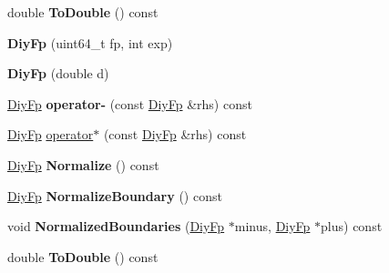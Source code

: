 \begin{DoxyCompactItemize}
\item 
double {\bfseries To\+Double} () const \hypertarget{structinternal_1_1_diy_fp_a9bbdcfcf5d1b3a7b16a8f5f860d74038}{}\label{structinternal_1_1_diy_fp_a9bbdcfcf5d1b3a7b16a8f5f860d74038}

\item 
{\bfseries Diy\+Fp} (uint64\+\_\+t fp, int exp)\hypertarget{structinternal_1_1_diy_fp_a9a8f2f5c49dfa0dee4a527f0829cc2e5}{}\label{structinternal_1_1_diy_fp_a9a8f2f5c49dfa0dee4a527f0829cc2e5}

\item 
{\bfseries Diy\+Fp} (double d)\hypertarget{structinternal_1_1_diy_fp_adc132c7da4c8e3ee5ae12efdcf6dbf7c}{}\label{structinternal_1_1_diy_fp_adc132c7da4c8e3ee5ae12efdcf6dbf7c}

\item 
\hyperlink{structinternal_1_1_diy_fp}{Diy\+Fp} {\bfseries operator-\/} (const \hyperlink{structinternal_1_1_diy_fp}{Diy\+Fp} \&rhs) const \hypertarget{structinternal_1_1_diy_fp_ade3efb95107203f2327fc3d5a802d4b7}{}\label{structinternal_1_1_diy_fp_ade3efb95107203f2327fc3d5a802d4b7}

\item 
\hyperlink{structinternal_1_1_diy_fp}{Diy\+Fp} \hyperlink{structinternal_1_1_diy_fp_ab536022d225b3014c98517a2dec4b986}{operator$\ast$} (const \hyperlink{structinternal_1_1_diy_fp}{Diy\+Fp} \&rhs) const 
\item 
\hyperlink{structinternal_1_1_diy_fp}{Diy\+Fp} {\bfseries Normalize} () const \hypertarget{structinternal_1_1_diy_fp_adae1948b1bb65d950cd3801a4a2bb7fd}{}\label{structinternal_1_1_diy_fp_adae1948b1bb65d950cd3801a4a2bb7fd}

\item 
\hyperlink{structinternal_1_1_diy_fp}{Diy\+Fp} {\bfseries Normalize\+Boundary} () const \hypertarget{structinternal_1_1_diy_fp_a1a4589d19230c9930d7f3dd5a9b7f7e7}{}\label{structinternal_1_1_diy_fp_a1a4589d19230c9930d7f3dd5a9b7f7e7}

\item 
void {\bfseries Normalized\+Boundaries} (\hyperlink{structinternal_1_1_diy_fp}{Diy\+Fp} $\ast$minus, \hyperlink{structinternal_1_1_diy_fp}{Diy\+Fp} $\ast$plus) const \hypertarget{structinternal_1_1_diy_fp_a64e623c1742d1d5ad551ab456f0deb62}{}\label{structinternal_1_1_diy_fp_a64e623c1742d1d5ad551ab456f0deb62}

\item 
double {\bfseries To\+Double} () const \hypertarget{structinternal_1_1_diy_fp_a9bbdcfcf5d1b3a7b16a8f5f860d74038}{}\label{structinternal_1_1_diy_fp_a9bbdcfcf5d1b3a7b16a8f5f860d74038}

\end{DoxyCompactItemize}
